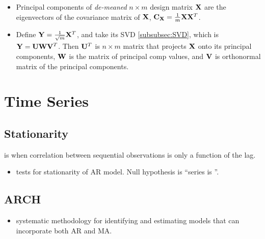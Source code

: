 \documentclass[11pt]{article}
\begin{document}
\begin{itemize}
  \item {} Principal components of \emph{de-meaned} $n \times m$
  design matrix $\mathbf{X}$ are the eigenvectors of the covariance matrix of $\mathbf{X}$,
  $\mathbf{C_X} = \frac{1}{m} \mathbf{X} \mathbf{X}^T$.
  \item {} Define $\mathbf{Y} = \frac{1}{\sqrt{m}} \mathbf{X}^T$, and take its SVD
  \ref{subsubsec:SVD}, which is $\mathbf{Y} = \mathbf{U} \mathbf{W} \mathbf{V}^T$. Then $\mathbf{U}^T$ is $n \times m$
  matrix that projects $\mathbf{X}$ onto its principal components, $\mathbf{W}$ is the matrix of
  principal comp values, and $\mathbf{V}$ is orthonormal matrix of the principal
  components. 
\end{itemize}



\section{Time Series}
\label{sec:timeseries}
\subsection{Stationarity}

\begin{definition} is when correlation between sequential
  observations is only a function of the lag.
\end{definition}

\begin{itemize}
  \item {} tests for stationarity of AR model. Null hypothesis is
  ``series is ''.
\end{itemize}

\subsection{ARCH}
\begin{itemize}
  \item{ systematic methodology for identifying and estimating models
    that can incorporate both AR and MA.}
\end{itemize}



\end{document}

